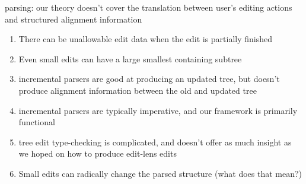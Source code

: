 parsing: our theory doesn't cover the translation between user's editing actions and structured alignment information
\begin{enumerate}
    \item There can be unallowable edit data when the edit is partially finished
    \item Even small edits can have a large smallest containing subtree
    \item incremental parsers are good at producing an updated tree, but doesn't produce alignment information between the old and updated tree
    \item incremental parsers are typically imperative, and our framework is primarily functional
    \item tree edit type-checking is complicated, and doesn't offer as much insight as we hoped on how to produce edit-lens edits
    \item Small edits can radically change the parsed structure (what does that mean?)
\end{enumerate}

